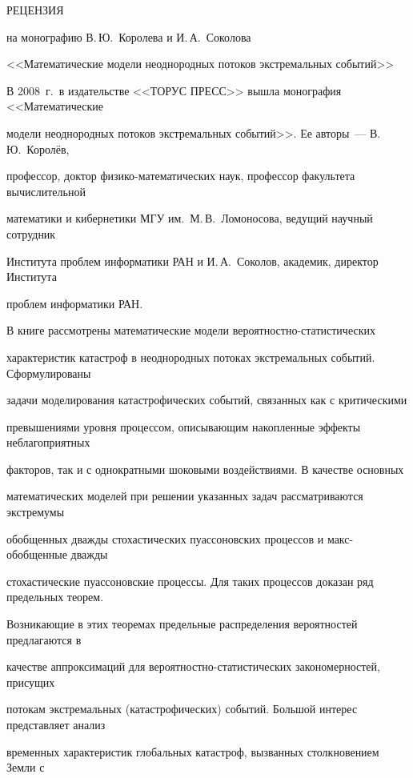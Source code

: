      РЕЦЕНЗИЯ


     на монографию В.\,Ю.~Королева и И.\,А.~Соколова


     <<Математические модели неоднородных потоков экстремальных событий>>


     


     В 2008~г.\ в издательстве <<ТОРУС ПРЕСС>> вышла монография <<Математические 


модели неоднородных потоков экстремальных событий>>. Ее авторы~--- В.\,Ю.~Королёв, 


профессор, доктор физико-математических наук, профессор факультета вычислительной 


математики и кибернетики МГУ им.\ М.\,В.~Ломоносова, ведущий научный сотрудник 


Института проблем информатики РАН и И.\,А.~Соколов, академик, директор Института 


проблем информатики РАН. 


     


     В книге рассмотрены математические модели вероятностно-статистических 


характеристик катастроф в неоднородных потоках экстремальных событий. Сформулированы 


задачи моделирования катастрофических событий, связанных как с критическими 


превышениями уровня процессом, описывающим накопленные эффекты неблагоприятных 


факторов, так и с однократными шоковыми воздействиями. В качестве основных 


математических моделей при решении указанных задач рассматриваются экстремумы 


обобщенных дважды стохастических пуассоновских процессов и макс-обобщенные дважды 


стохастические пуассоновские процессы. Для таких процессов доказан ряд предельных теорем. 


Возникающие в этих теоремах предельные распределения вероятностей предлагаются в 


качестве аппроксимаций для вероятностно-статистических закономерностей, присущих 


потокам экстремальных (катастрофических) событий. Большой интерес представляет анализ 


временных характеристик глобальных катастроф, вызванных столкновением Земли с 


